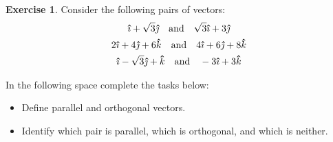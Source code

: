 \documentclass[12pt]{article}
\theoremstyle{plain}
\theoremstyle{definition}
\newtheorem{Ej}[Th]{Exercise}         %
\theoremstyle{remark}
\newcommand{\thickhat}[1]{\mathbf{\hat{\text{$#1$}}}}
\newcommand{\ii}{\vu{\imath}}
\newcommand{\jj}{\vu{\jmath}}
\newcommand{\kk}{\thickhat{k}}
\renewcommand{\:}{\colon}           %
\renewcommand{\.}{\Cdot}                %
\begin{document}
  \begin{Ej}
    Consider the following pairs of vectors:
    \setcounter{equation}{0}
    \begin{gather}
      \ii + \sqrt{3}\jj \quad \text{and} \quad \sqrt{3}\ii + 3\jj \\
      2\ii + 4\jj + 6\kk \quad \text{and} \quad 4\ii + 6\jj + 8\kk \\
      \ii - \sqrt{3}\jj + \kk \quad \text{and} \quad -3\ii + 3\kk
    \end{gather}
  
    In the following space complete the tasks below:
    \begin{itemize}
      \item Define parallel and orthogonal vectors.
      \item Identify which pair is parallel, which is orthogonal, and which is neither.
    \end{itemize}
  \end{Ej}
  
\end{document}
